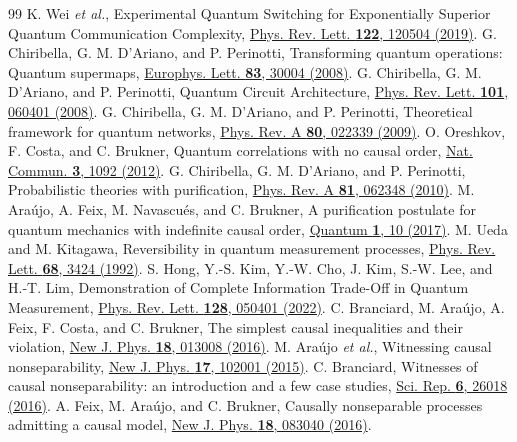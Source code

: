\documentclass[11pt]{article}
\begin{document}
\begin{thebibliography}{99}
 K. Wei \emph{et al.}, Experimental Quantum Switching for Exponentially Superior Quantum Communication Complexity, \href{https://doi.org/10.1103/PhysRevLett.122.120504}{Phys. Rev. Lett. \textbf{122}, 120504 (2019)}.
 G. Chiribella, G. M. D'Ariano, and P. Perinotti, Transforming quantum operations: Quantum supermaps, \href{https://doi.org/10.1209/0295-5075/83/30004}{Europhys. Lett. \textbf{83}, 30004 (2008)}.
 G. Chiribella, G. M. D'Ariano, and P. Perinotti, Quantum Circuit Architecture, \href{https://doi.org/10.1103/PhysRevLett.101.060401}{Phys. Rev. Lett. \textbf{101}, 060401 (2008)}.
 G. Chiribella, G. M. D'Ariano, and P. Perinotti, Theoretical framework for quantum networks, \href{https://doi.org/10.1103/PhysRevA.80.022339}{Phys. Rev. A \textbf{80}, 022339 (2009)}.
 O. Oreshkov, F. Costa, and C. Brukner, Quantum correlations with no causal order, \href{https://doi.org/10.1038/ncomms2076}{Nat. Commun. \textbf{3}, 1092 (2012)}.
 G. Chiribella, G. M. D'Ariano, and P. Perinotti, Probabilistic theories with purification, \href{https://doi.org/10.1103/PhysRevA.81.062348}{Phys. Rev. A \textbf{81}, 062348 (2010)}.
 M. Ara\'{u}jo, A. Feix, M. Navascu\'{e}s, and C. Brukner, A purification postulate for quantum mechanics with indefinite causal order, \href{https://doi.org/10.22331/q-2017-04-26-10}{Quantum \textbf{1}, 10 (2017)}.
 M. Ueda and M. Kitagawa, Reversibility in quantum measurement processes, \href{https://doi.org/10.1103/PhysRevLett.68.3424}{Phys. Rev. Lett. \textbf{68}, 3424 (1992)}.
 S. Hong, Y.-S. Kim, Y.-W. Cho, J. Kim, S.-W. Lee, and H.-T. Lim, Demonstration of Complete Information Trade-Off in Quantum Measurement, \href{https://doi.org/10.1103/PhysRevLett.128.050401}{Phys. Rev. Lett. \textbf{128}, 050401 (2022)}.
 C. Branciard, M. Ara\'{u}jo, A. Feix, F. Costa, and C. Brukner, The simplest causal inequalities and their violation, \href{https://doi.org/10.1088/1367-2630/18/1/013008}{New J. Phys. \textbf{18}, 013008 (2016)}.
 M. Ara\'{u}jo \emph{et al.}, Witnessing causal nonseparability, \href{https://doi.org/10.1088/1367-2630/17/10/102001}{New J. Phys. \textbf{17}, 102001 (2015)}.
 C. Branciard, Witnesses of causal nonseparability: an introduction and a few case studies, \href{https://doi.org/10.1038/srep26018}{Sci. Rep. \textbf{6}, 26018 (2016)}.
 A. Feix, M. Ara\'{u}jo, and C. Brukner, Causally nonseparable processes admitting a causal model, \href{https://doi.org/10.1088/1367-2630/18/8/083040}{New J. Phys. \textbf{18}, 083040 (2016)}.

\end{thebibliography}
\end{document}
